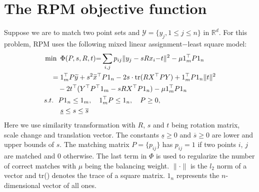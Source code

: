 \documentclass[11pt,bezier,]{article}
\begin{document}
 
 

 

\section{
The RPM objective function
\label{sec:RPM}
}


Suppose we are to match
two point sets   
and 
$\mathscr Y = \{y_j , 1\le j\le n\}$ in $\mathbb R^d$.
For this problem, 
RPM uses the following
 mixed linear assignment$-$least square model:
\begin{align}
&\min\ \Phi(P, s,R, t){=}
\sum_{i,j}p_{ij}\| { y}_j-sR  x_i {-}  t\|^2 %
-\mu 1_m^\top P1_n \notag\\
 &\quad= 1_m^\top P  {\widetilde y} + s^2 {\widetilde x}^\top P  1_n 
 - 2s\cdot \text{tr}(R X^\top P Y )
 + 1_m^\top P1_n \|  t\|^2  
   \notag \\
&\qquad -2  t^\top (Y^\top P^\top  1_m   - s R X^\top P   1_n)  
-\mu 1_m^\top P1_n  \label{E_lin_tr} \\
 &s.t.\ \  P 1_n\le1_m, \quad 1_m^\top P\le 1_n,   
 \quad P\ge 0, \label{inequal_assign_const} \\
&\ \qquad \underline{s}\le s \le \overline{s} \label{s_range}
\end{align}
Here we use
similarity transformation
with $R$, $s$ and $t$ being rotation matrix,
scale change and translation vector. %
The constants $\underline{s}\ge 0$ and $\overline{s}\ge0$ are lower and upper  bounds of $s$.
The matching matrix $P=\{p_{ij}\}$ has   $p_{ij}=1$
if two points $i$, $j$ are matched and $0$  otherwise.
The last term in $\Phi$ is used to regularize the number of correct matches %
with $\mu$ being the balancing weight.
$\|\cdot\|$ is  the $l_2$  norm of a vector
and tr() denotes the trace of a square matrix.
$1_n$ represents the $n$-dimensional vector of all ones.
\end{document}
